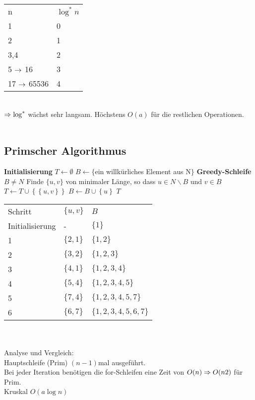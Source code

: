 \documentclass[a4paper]{scrartcl}
\begin{document}
\begin{tabular}{ll}
n								& $\log^{\ast}n$\\
1								& 0\\
2								& 1\\
3,4							& 2\\
5 $\rightarrow$ 16			& 3\\
17 $\rightarrow$ 65536 &	 4\\
\end{tabular}\\

$\Rightarrow \log^{\ast}$ wächst sehr langsam. Höchstens $O(a)$ für die restlichen Operationen.\\ \\

\subsection{Primscher Algorithmus}
\begin{codebox}
\zi \textbf{Initialisierung}
\li $T \gets \emptyset$
\li $B \gets \{$ein willkürliches Element aus N$\}$
\zi \textbf{Greedy-Schleife}
\li \While $B \neq N$
\li     \Do
            Finde $\{u,v\}$ von minimaler Länge, so dass $u\in N\backslash B$ und $v \in B$
\li         $T \gets T \cup \left\{\left\{u,v\right\} \right\}$
\li         $B \gets B \cup \left\{u\right\}$
        \End
\li \Return $T$
\end{codebox}


\begin{tabular}{lll}
Schritt 				& $\{u,v\}$ & $B$ \\
Initialisierung & - 				& $\{1\}$ \\
1 							& $\{2,1\}$ & $\{1,2\}$ \\
2 							& $\{3,2\}$ & $\{1,2,3\}$ \\
3 							& $\{4,1\}$ & $\{1,2,3,4\}$ \\
4 							& $\{5,4\}$ & $\{1,2,3,4,5\}$ \\
5 							& $\{7,4\}$ & $\{1,2,3,4,5,7\}$ \\
6 							& $\{6,7\}$ & $\{1,2,3,4,5,6,7\}$ \\
\end{tabular} \\ \\

Analyse und Vergleich:\\
Hauptschleife (Prim) $(n-1)$mal ausgeführt.\\
Bei jeder Iteration benötigen die for-Schleifen eine Zeit von $O(n) \Rightarrow O(n2)$ für Prim.\\
Kruskal $O(a \log{n})$
\end{document}
